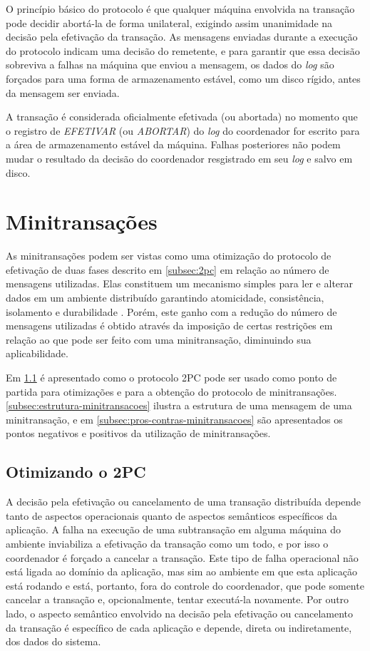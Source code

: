 \documentclass[11pt,twoside,a4paper]{book}
\begin{document}
O princípio básico do protocolo é que qualquer máquina envolvida na transação pode decidir abortá-la de forma unilateral, exigindo assim unanimidade na decisão pela efetivação da transação. As mensagens enviadas durante a execução do protocolo indicam uma decisão do remetente, e para garantir que essa decisão sobreviva a falhas na máquina que enviou a mensagem, os dados do \emph{log} são forçados para uma forma de armazenamento estável, como um disco rígido, antes da mensagem ser enviada.

A transação é considerada oficialmente efetivada (ou abortada) no momento que o registro de \emph{EFETIVAR} (ou \emph{ABORTAR}) do \emph{log} do coordenador for escrito para a área de armazenamento estável da máquina. Falhas posteriores não podem mudar o resultado da decisão do coordenador resgistrado em seu \emph{log} e salvo em disco.

\section{Minitransações}
\label{sec:minitransacoes}
As minitransações podem ser vistas como uma otimização do protocolo de efetivação de duas fases descrito em \ref{subsec:2pc} em relação ao número de mensagens utilizadas. Elas constituem um mecanismo simples para ler e alterar dados em um ambiente distribuído garantindo atomicidade, consistência, isolamento e durabilidade \cite{sinfonia}. Porém, este ganho com a redução do número de mensagens utilizadas é obtido através da imposição de certas restrições em relação ao que pode ser feito com uma minitransação, diminuindo sua aplicabilidade.

Em \ref{subsec:derivando-minitransacoes} é apresentado como o protocolo 2PC pode ser usado como ponto de partida para otimizações e para a obtenção do protocolo de minitransações. \ref{subsec:estrutura-minitransacoes} ilustra a estrutura de uma mensagem de uma minitransação, e em \ref{subsec:pros-contras-minitransacoes} são apresentados os pontos negativos e positivos da utilização de minitransações.

\subsection{Otimizando o 2PC}
\label{subsec:derivando-minitransacoes}
A decisão pela efetivação ou cancelamento de uma transação distribuída depende tanto de aspectos operacionais quanto de aspectos semânticos específicos da aplicação. A falha na execução de uma subtransação em alguma máquina do ambiente inviabiliza a efetivação da transação como um todo, e por isso o coordenador é forçado a cancelar a transação. Este tipo de falha operacional não está ligada ao domínio da aplicação, mas sim ao ambiente em que esta aplicação está rodando e está, portanto, fora do controle do coordenador, que pode somente cancelar a transação e, opcionalmente, tentar executá-la novamente. Por outro lado, o aspecto semântico envolvido na decisão pela efetivação ou cancelamento da transação é específico de cada aplicação e depende, direta ou indiretamente, dos dados do sistema.
\end{document}
